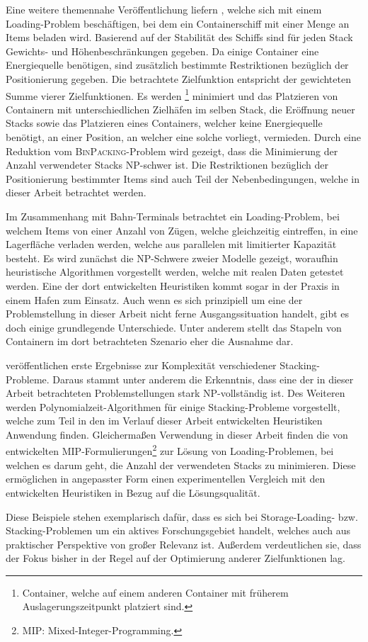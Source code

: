 Eine weitere themennahe Veröffentlichung liefern \citet{Delgado2012}, welche sich mit einem
Loading-Problem beschäftigen, bei dem ein Containerschiff mit einer Menge an Items beladen wird.
Basierend auf der Stabilität des Schiffs sind für jeden Stack Gewichts- und Höhenbeschränkungen gegeben.
Da einige Container eine Energiequelle benötigen, sind zusätzlich bestimmte Restriktionen bezüglich der
Positionierung gegeben.
Die betrachtete Zielfunktion entspricht der gewichteten Summe vierer Zielfunktionen.
Es werden \footnote{Container, welche auf einem anderen Container mit früherem Auslagerungszeitpunkt platziert sind.} minimiert und das Platzieren von Containern mit unterschiedlichen Zielhäfen
im selben Stack, die Eröffnung neuer Stacks sowie das Platzieren eines Containers,
welcher keine Energiequelle benötigt, an einer Position, an welcher eine solche vorliegt, vermieden.
Durch eine Reduktion vom \textsc{BinPacking}-Problem wird gezeigt,
dass die Minimierung der Anzahl verwendeter Stacks NP-schwer ist.
Die Restriktionen bezüglich der Positionierung bestimmter Items sind auch Teil der Nebenbedingungen,
welche in dieser Arbeit betrachtet werden.

Im Zusammenhang mit Bahn-Terminals betrachtet \citet{Jaehn2013} ein Loading-Problem,
bei welchem Items von einer Anzahl von Zügen, welche gleichzeitig eintreffen,
in eine Lagerfläche verladen werden, welche aus parallelen  mit limitierter Kapazität besteht.
Es wird zunächst die NP-Schwere zweier Modelle gezeigt, woraufhin heuristische Algorithmen vorgestellt werden,
welche mit realen Daten getestet werden. Eine der dort entwickelten Heuristiken kommt sogar in der Praxis
in einem Hafen zum Einsatz. Auch wenn es sich prinzipiell um eine der Problemstellung in dieser
Arbeit nicht ferne Ausgangssituation handelt, gibt es doch einige grundlegende Unterschiede.
Unter anderem stellt das Stapeln von Containern im dort betrachteten Szenario eher die Ausnahme dar.

\vfill
\pagebreak

\citet{Bruns2015} veröffentlichen erste Ergebnisse zur Komplexität verschiedener Stacking-Probleme.
Daraus stammt unter anderem die Erkenntnis, dass eine der in dieser Arbeit betrachteten Problemstellungen stark NP-vollständig ist. Des Weiteren werden Polynomialzeit-Algorithmen für einige Stacking-Probleme vorgestellt,
welche zum Teil in den im Verlauf dieser Arbeit entwickelten Heuristiken Anwendung finden.\newline
Gleichermaßen Verwendung in dieser Arbeit finden die von \citet{Le2016} entwickelten
MIP-Formulierungen\footnote{MIP: Mixed-Integer-Programming.} zur Lösung von Loading-Problemen,
bei welchen es darum geht, die Anzahl der verwendeten Stacks zu minimieren. Diese ermöglichen in angepasster Form einen experimentellen Vergleich mit den entwickelten Heuristiken in Bezug auf die Lösungsqualität.

Diese Beispiele stehen exemplarisch dafür, dass es sich bei Storage-Loading- bzw. Stacking-Problemen um
ein aktives Forschungsgebiet handelt, welches auch aus praktischer Perspektive von großer Relevanz ist.
Außerdem verdeutlichen sie, dass der Fokus bisher in der Regel auf der Optimierung anderer Zielfunktionen lag.

\vfill
\pagebreak

